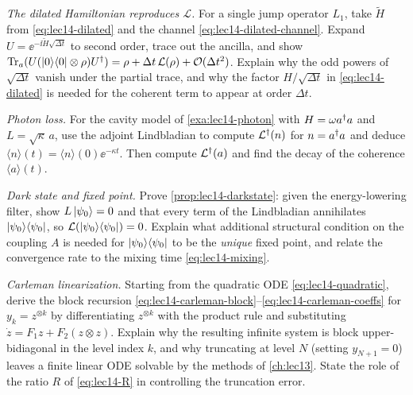 \begin{exercise}\label{ex:lec14-3}
\emph{The dilated Hamiltonian reproduces $\mathcal L$.} For a single jump operator $L_1$, take
$\widetilde H$ from \eqref{eq:lec14-dilated} and the channel \eqref{eq:lec14-dilated-channel}.
Expand $U=\ee^{-\ii\widetilde H\sqrt{\Delta t}}$ to second order, trace out the ancilla, and show
$\operatorname{Tr}_a(U(\ket{0}\!\bra{0}\otimes\rho)U^{\dagger})=\rho+\Delta t\,\mathcal L(\rho)+\mathcal O(\Delta t^2)$. Explain
why the odd powers of $\sqrt{\Delta t}$ vanish under the partial trace, and why the factor
$H/\sqrt{\Delta t}$ in \eqref{eq:lec14-dilated} is needed for the coherent term to appear at order
$\Delta t$.
\end{exercise}

\begin{exercise}\label{ex:lec14-4}
\emph{Photon loss.} For the cavity model of \cref{exa:lec14-photon} with $H=\omega a^{\dagger} a$ and
$L=\sqrt\kappa\,a$, use the adjoint Lindbladian to compute $\mathcal L^{\dagger}(n)$ for $n=a^{\dagger} a$ and
deduce $\langle n\rangle(t)=\langle n\rangle(0)\ee^{-\kappa t}$. Then compute $\mathcal L^{\dagger}(a)$
and find the decay of the coherence $\langle a\rangle(t)$.
\end{exercise}

\begin{exercise}\label{ex:lec14-5}
\emph{Dark state and fixed point.} Prove \cref{prop:lec14-darkstate}: given the energy-lowering
filter, show $L\ket{\psi_0}=0$ and that every term of the Lindbladian annihilates
$\ket{\psi_0}\!\bra{\psi_0}$, so $\mathcal L(\ket{\psi_0}\!\bra{\psi_0})=0$. Explain what additional structural condition on
the coupling $A$ is needed for $\ket{\psi_0}\!\bra{\psi_0}$ to be the \emph{unique} fixed point, and relate the
convergence rate to the mixing time \eqref{eq:lec14-mixing}.
\end{exercise}

\begin{exercise}\label{ex:lec14-6}
\emph{Carleman linearization.} Starting from the quadratic ODE \eqref{eq:lec14-quadratic}, derive
the block recursion \eqref{eq:lec14-carleman-block}--\eqref{eq:lec14-carleman-coeffs} for
$y_k=z^{\otimes k}$ by differentiating $z^{\otimes k}$ with the product rule and substituting
$\dot z=F_1 z+F_2(z\otimes z)$. Explain why the resulting infinite system is block upper-bidiagonal
in the level index $k$, and why truncating at level $N$ (setting $y_{N+1}=0$) leaves a finite
linear ODE solvable by the methods of \cref{ch:lec13}. State the role of the ratio $R$ of
\eqref{eq:lec14-R} in controlling the truncation error.
\end{exercise}

